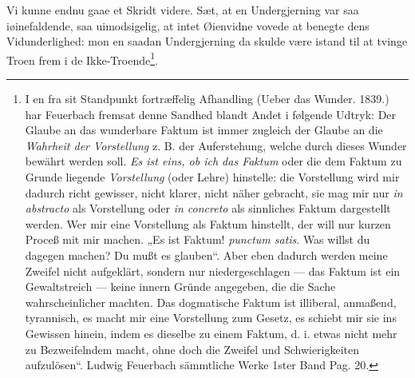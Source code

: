 \documentclass[12pt,a4paper]{book}
\begin{document}
Vi kunne endnu gaae et Skridt videre. Sæt, at en Undergjerning var saa iøinefaldende,
saa uimodsigelig, at intet Øienvidne vovede at benegte dens Vidunderlighed: mon en
saadan Undergjerning da skulde være istand til at tvinge Troen frem i de
Ikke-Troende\footnote{%
I en fra sit Standpunkt fortræffelig Afhandling (Ueber das Wunder. 1839.) har Feuerbach
fremsat denne Sandhed blandt Andet i følgende Udtryk: Der Glaube an das wunderbare
Faktum ist immer zugleich der Glaube an die \emph{Wahrheit der Vorstellung} z. B. der
Auferstehung, welche durch dieses Wunder bewährt werden soll. \emph{Es ist eins, ob ich
das Faktum} oder die dem Faktum zu Grunde liegende \emph{Vorstellung} (oder Lehre)
hinstelle: die Vorstellung wird mir dadurch richt gewisser, nicht klarer, nicht näher
gebracht, sie mag mir nur \textit{in abstracto} als Vorstellung oder \textit{in
concreto} als sinnliches Faktum dargestellt werden. Wer mir eine Vorstellung als Faktum
hinstellt, der will nur kurzen Proceß mit mir machen. „Es ist Faktum! \textit{punctum
satis}. Was willst du dagegen machen? Du mußt es glauben“. Aber eben dadurch werden
meine Zweifel nicht aufgeklärt, sondern nur niedergeschlagen --- das Faktum ist ein
Gewaltstreich --- keine innern Gründe angegeben, die die Sache wahrscheinlicher
machten. Das dogmatische Faktum ist illiberal, anmaßend, tyrannisch, es macht mir eine
Vorstellung zum Gesetz, es schiebt mir sie ins Gewissen hinein, indem es dieselbe zu
einem Faktum, d. i. etwas nicht mehr zu Bezweifelndem macht, ohne doch die Zweifel und
Schwierigkeiten aufzulösen“. Ludwig Feuerbach sämmtliche Werke 1ster Band Pag. 20.}.
\end{document}
